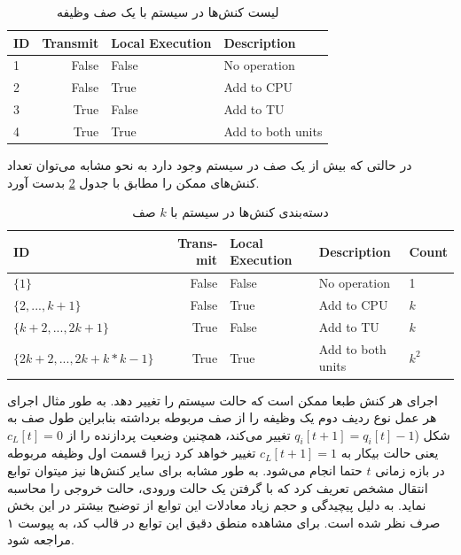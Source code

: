 \begin{table}[H]
	\centering
	\begin{latin}
			\begin{tabular}{@{}lrll@{}}
			\toprule
			\textbf{ID} & \textbf{Transmit} & \textbf{Local Execution} & \textbf{Description} \\ \midrule
			1           & False             & False                    & No operation         \\
			2           & False             & True                     & Add to CPU           \\
			3           & True              & False                    & Add to TU            \\
			4           & True              & True                     & Add to both units    \\ \bottomrule
		\end{tabular}
	\end{latin}
	\caption{لیست کنش‌ها در سیستم با یک صف وظیفه}
	\label{table:actions}
\end{table}
در حالتی که بیش از یک صف در سیستم وجود دارد به نحو مشابه می‌توان تعداد کنش‌های ممکن را مطابق با جدول \ref{table:actions-multiqueue} بدست آورد.
\begin{table}[H]
	\begin{latin}
		\begin{tabular}{@{}lrlll@{}}
			\toprule
			\textbf{ID}                     & \textbf{Transmit} & \textbf{Local Execution} & \textbf{Description} & \textbf{Count}                \\ \midrule
			$\{1\}$                           & False             & False                    & No operation         & 1                    \\
			$\{2, ..., k + 1\}$               & False             & True                     & Add to CPU           & $k$                    \\
			$\{k + 2, ..., 2k + 1\}$          & True              & False                    & Add to TU            & $k$                    \\
			$\{2k + 2, ..., 2k + k * k - 1\}$ & True              & True                     & Add to both units    & $k^2$ \\ \bottomrule
		\end{tabular}
	\end{latin}
	\caption{دسته‌بندی کنش‌ها در سیستم با $k$ صف}
	\label{table:actions-multiqueue}
\end{table}
اجرای هر کنش طبعا ممکن است که حالت سیستم را تغییر دهد. به طور مثال اجرای هر عمل نوع ردیف دوم یک وظیفه را از صف مربوطه برداشته بنابراین طول صف به شکل (\(q_i[t + 1] = q_i[t] - 1\) تغییر می‌کند، همچنین وضعیت پردازنده را از \(c_L[t] = 0\) یعنی حالت بیکار به \(c_L[t + 1] = 1\) تغییر خواهد کرد زیرا قسمت اول وظیفه مربوطه در بازه زمانی \(t\) حتما انجام می‌شود. به طور مشابه برای سایر کنش‌ها نیز میتوان توابع انتقال مشخص تعریف کرد که با گرفتن یک حالت ورودی، حالت خروجی را محاسبه نماید. به دلیل پیچیدگی و حجم زیاد معادلات این توابع از توضیح بیشتر در این بخش صرف نظر شده است. برای مشاهده منطق دقیق این توابع در قالب کد، به پیوست ۱ مراجعه شود.

